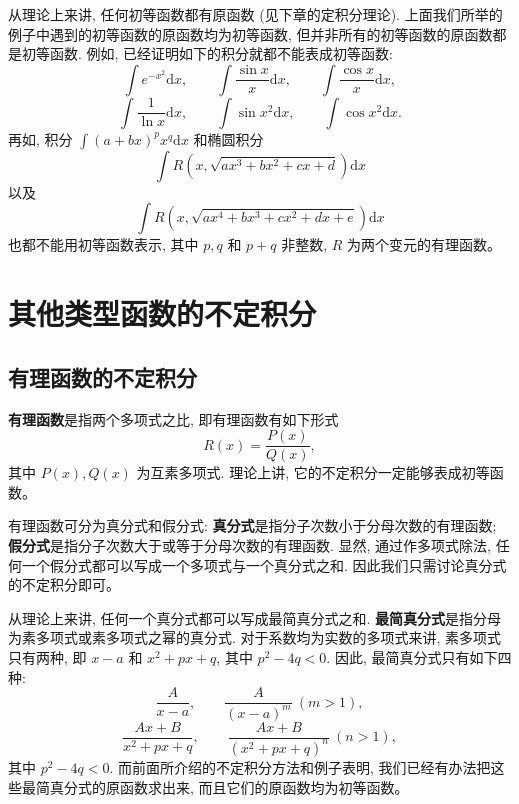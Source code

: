 \documentclass[UTF8, 12pt, fontset=fandol, oneside]{ctexart}
\begin{document}
从理论上来讲, 任何初等函数都有原函数 (见下章的定积分理论). 上面我们所举的例子中遇到的初等函数的原函数均为初等函数, 但并非所有的初等函数的原函数都是初等函数. 例如, 已经证明如下的积分就都不能表成初等函数:
\[
  \int e^{-x^2}\mathrm dx,\qquad
  \int\frac{\sin x}{x}\mathrm dx,\qquad
  \int\frac{\cos x}{x}\mathrm dx,
\]
\[
  \int\frac1{\ln x}\mathrm dx,\qquad
  \int\sin x^2\mathrm dx,\qquad
  \int\cos x^2\mathrm dx.
\]
再如, 积分 $\int(a+bx)^px^q\mathrm dx$ 和椭圆积分
\[
  \int R(x,\sqrt{ax^3+bx^2+cx+d})\mathrm dx
\]
以及
\[
  \int R(x,\sqrt{ax^4+bx^3+cx^2+dx+e})\mathrm dx
\]
也都不能用初等函数表示, 其中 $p,q$ 和 $p+q$ 非整数, $R$ 为两个变元的有理函数。

\section{其他类型函数的不定积分}

\subsection{有理函数的不定积分}

\textbf{有理函数}是指两个多项式之比, 即有理函数有如下形式
\[
  R(x)=\frac{P(x)}{Q(x)},
\]
其中 $P(x),Q(x)$ 为互素多项式. 理论上讲, 它的不定积分一定能够表成初等函数。

有理函数可分为真分式和假分式: \textbf{真分式}是指分子次数小于分母次数的有理函数; \textbf{假分式}是指分子次数大于或等于分母次数的有理函数. 显然, 通过作多项式除法, 任何一个假分式都可以写成一个多项式与一个真分式之和. 因此我们只需讨论真分式的不定积分即可。

从理论上来讲, 任何一个真分式都可以写成最简真分式之和. \textbf{最简真分式}是指分母为素多项式或素多项式之幂的真分式. 对于系数均为实数的多项式来讲, 素多项式只有两种, 即 $x-a$ 和 $x^2+px+q$, 其中 $p^2-4q<0$. 因此, 最简真分式只有如下四种:
\[
  \frac A{x-a},\qquad
  \frac A{(x-a)^m}\ (m>1),
\]
\[
  \frac{Ax+B}{x^2+px+q},\qquad
  \frac{Ax+B}{(x^2+px+q)^n}\ (n>1),
\]
其中 $p^2-4q<0$. 而前面所介绍的不定积分方法和例子表明, 我们已经有办法把这些最简真分式的原函数求出来, 而且它们的原函数均为初等函数。
\end{document}

